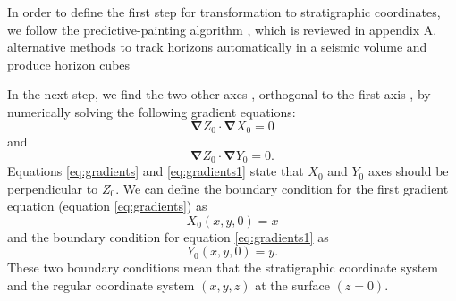 In order to define the first step for transformation to stratigraphic coordinates, we follow the predictive-painting algorithm \cite[]{sergeyfomel2010}, which is reviewed in appendix A.   alternative methods  to track horizons automatically in a seismic volume and produce horizon cubes \cite[]{hoyes2011,wolak2013}\old{,}                                                                                 

 
In the next step, we find the two other axes\new{,} , orthogonal to the first axis\new{,} , by numerically solving the following gradient equations:
\begin{equation}
\label{eq:gradients}
\mathbf{\nabla} Z_0 \cdot \mathbf{\nabla }X_0 = 0
\end{equation}
and
\begin{equation}
\label{eq:gradients1}
\mathbf{\nabla} Z_0 \cdot \mathbf{\nabla} Y_0 = 0.
\end{equation}
Equations \ref{eq:gradients}  and \ref{eq:gradients1}  state that  $X_0$ and $Y_0$ axes should be perpendicular to $Z_0$.  We can define the boundary condition for the first gradient equation (equation \ref{eq:gradients}) as
\begin{equation}
\label{boundary condition}
X_0\left(x,y,0\right)=x                                                                         
\end{equation}
and the boundary condition for equation \ref{eq:gradients1} as
\begin{equation}
\label{boundary condition1}
Y_0\left(x,y,0\right)=y.                                                                         
\end{equation} 
These two boundary conditions mean that the stratigraphic coordinate system and the regular coordinate system $\left(x,y,z\right)$   at the surface $\left(z = 0\right)$. 

